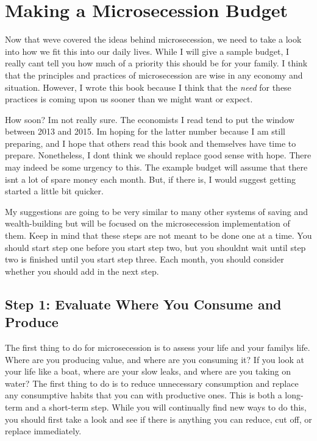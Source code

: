 \chapter{Making a Microsecession Budget}

Now that we{\textquotesingle}ve covered the ideas behind microsecession,
we need to take a look into how we fit this into our daily lives. While
I will give a sample budget, I really can{\textquotesingle}t tell you
how much of a priority this should be for your family. I think that the
principles and practices of microsecession are wise in any economy and
situation. However, I wrote this book because I think that the
\textit{need} for these practices is coming upon us sooner than we
might want or expect.

How soon?  I{\textquotesingle}m not really sure. The economists I read
tend to put the window between 2013 and 2015. I{\textquotesingle}m
hoping for the latter number because I am still preparing, and I hope
that others read this book and themselves have time to prepare.
Nonetheless, I don{\textquotesingle}t think we should replace good
sense with hope. There may indeed be some urgency to this. The example
budget will assume that there isn{\textquotesingle}t a lot of spare
money each month. But, if there is, I would suggest getting started a
little bit quicker.

My suggestions are going to be very similar to many other systems of
saving and wealth-building but will be focused on the microsecession
implementation of them.
Keep in mind that
these steps are not meant to be done one at a time. You should start
step one before you start step two, but you shouldn{\textquotesingle}t
wait until step two is finished until you start step three. Each month,
you should consider whether you should add in the next step.

\section{Step 1: Evaluate Where You Consume and Produce}

The first thing to do for microsecession is to assess your life and your
family{\textquotesingle}s life. Where are you producing value, and
where are you consuming it?  If you look at your life like a boat,
where are your slow leaks, and where are you taking on water?  The
first thing to do is to reduce unnecessary consumption and replace any
consumptive habits that you can with productive ones. This is both a
long-term and a short-term step. While you will continually find new
ways to do this, you should first take a look and see if there is
anything you can reduce, cut off, or replace immediately.


